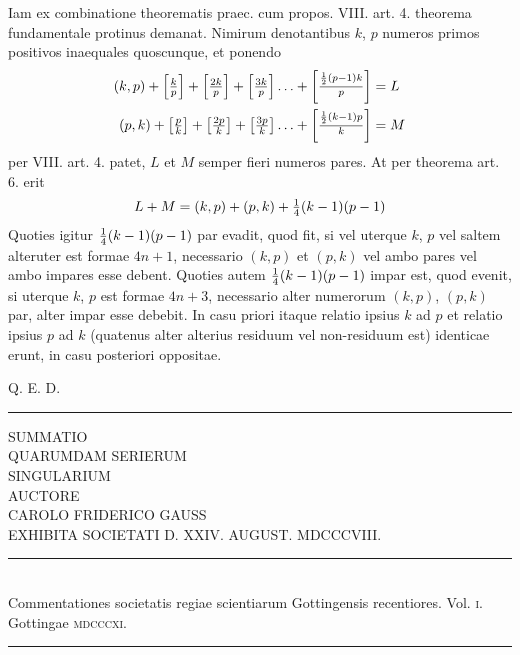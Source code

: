 \documentclass[twoside,12pt, showframe]{memoir}
\let\oldfrac\frac
\def\frac#1#2{\mathchoice{\tfrac{#1}{#2}}{\oldfrac{#1}{#2}}{\genfrac{}{}{}{2}{#1}{#2\mathstrut}}{\genfrac{}{}{}{3}{#1}{#2\mathstrut}}}
\begin{document}
Iam ex combinatione theorematis praec. cum propos. VIII. art. 4. theorema fundamentale protinus demanat. Nimirum denotantibus \(k\), \(p\) numeros primos positivos inaequales quoscunque, et ponendo
\[\begin{aligned}
(k, p)+\left[\frac{k}{p}\right]+\left[\frac{2 k}{p}\right]+\left[\frac{3 k}{p}\right] \ldots+\left[\frac{\frac{1}{2} (p-1) k}{p} \right] &=L\\
(p, k)+\left[\frac{p}{k}\right]+\left[\frac{2 p}{k}\right]+\left[\frac{3 p}{k}\right] \ldots+\left[\frac{\frac{1}{2} (k-1) p}{k}\right] &= M
\end{aligned}\]
per VIII. art. 4. patet, \(L\) et \(M\) semper fieri numeros pares. At per theorema art. 6. erit
\[L+M=(k, p)+(p, k)+\frac{1}{4}(k-1)(p-1)\]
Quoties igitur \(\frac{1}{4}(k-1)(p-1)\) par evadit, quod fit, si vel uterque \(k\), \(p\) vel saltem alteruter est formae \(4 n+1\), necessario \((k, p)\) et \((p, k)\) vel ambo pares vel ambo impares esse debent. Quoties autem \(\frac{1}{4}(k-1)(p-1)\) impar est, quod evenit, si uterque \(k\), \(p\) est formae \(4 n+3\), necessario alter numerorum \((k, p)\), \((p, k)\) par, alter impar esse debebit. In casu priori itaque relatio ipsius \(k\) ad \(p\) et relatio ipsius \(p\) ad \(k\) (quatenus alter alterius residuum vel non-residuum est) identicae erunt, in casu posteriori oppositae.
 
\qquad Q. E. D.\\[\baselineskip]
\begin{center}\rule{1.5in}{0.5pt}\end{center}
\clearpage\noindent%

\begin{center}
{\large SUMMATIO }\\[2\baselineskip]
{\LARGE QUARUMDAM SERIERUM}\\[2\baselineskip]
{\Large SINGULARIUM}\\[4\baselineskip]
{\scriptsize AUCTORE}\\[1.5\baselineskip]
{CAROLO FRIDERICO GAUSS}\\[1.5\baselineskip]
{\scriptsize EXHIBITA SOCIETATI D. XXIV. AUGUST. MDCCCVIII.}\\[4\baselineskip]
\rule{4in}{0.5pt}\\[0.5\baselineskip]
{\scriptsize Commentationes societatis regiae scientiarum Gottingensis recentiores. Vol. \textsc{i}.\\
Gottingae \textsc{mdcccxi}.}\\
\rule{4in}{0.5pt}
\end{center}
\clearpage\noindent%
\;
\clearpage\noindent%
\end{document}

